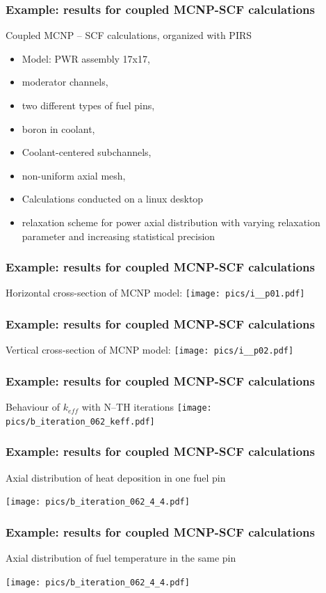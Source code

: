 \documentclass[t]{beamer}
\begin{document}
\newcommand{\exResult}{Example: results for coupled MCNP-SCF calculations}
\begin{frame}\frametitle{\exResult}

    Coupled MCNP -- SCF calculations, organized with PIRS
    \begin{itemize}
        \item Model: PWR assembly 17x17,
        \item moderator channels,
        \item two different types of fuel pins,
        \item boron in coolant,
        \item Coolant-centered subchannels,
        \item non-uniform axial mesh,
        \item Calculations conducted on a linux desktop
        \item relaxation scheme for power axial distribution with varying relaxation parameter and increasing statistical precision

    \end{itemize}

\end{frame}

\begin{frame}\frametitle{\exResult}

    Horizontal cross-section of MCNP model:
    \texttt{[image: pics/i\_\_p01.pdf]}

\end{frame}
\begin{frame}\frametitle{\exResult}

    Vertical cross-section of MCNP model:
    \texttt{[image: pics/i\_\_p02.pdf]}

\end{frame}
\begin{frame}\frametitle{\exResult}

    Behaviour of  $k_{eff}$ with N--TH iterations 
    \texttt{[image: pics/b\_iteration\_062\_keff.pdf]}
\end{frame}

\begin{frame}\frametitle{\exResult}
    Axial distribution of heat deposition in one fuel pin

    \texttt{[image: pics/b\_iteration\_062\_4\_4.pdf]}
\end{frame}

\begin{frame}\frametitle{\exResult}
    Axial distribution of fuel temperature in the same pin

    \texttt{[image: pics/b\_iteration\_062\_4\_4.pdf]}
\end{frame}
\end{document}
